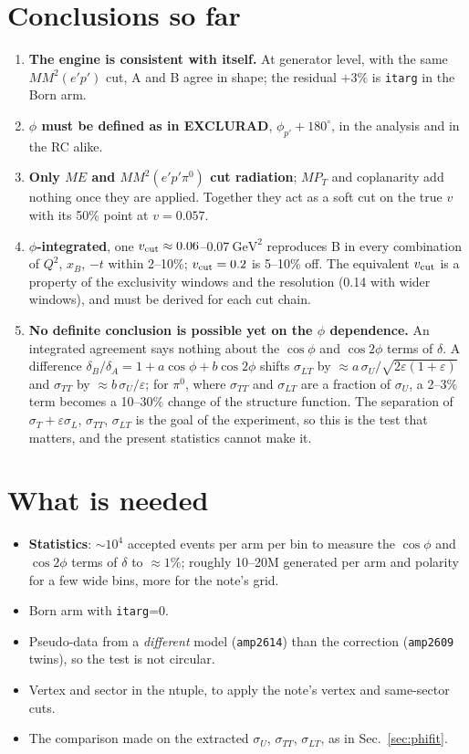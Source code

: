 \documentclass[11pt]{article}
\newcommand{\vcut}{v_{\rm cut}}
\newcommand{\mmep}{MM^2(e'p')}
\newcommand{\mmtot}{MM^2(e'p'\pi^0)}
\begin{document}
\section{Conclusions so far}

\begin{enumerate}
\item \textbf{The engine is consistent with itself.} At generator level, with the same $\mmep$ cut,
  A and B agree in shape; the residual $+3\%$ is \texttt{itarg} in the Born arm.
\item \textbf{$\phi$ must be defined as in EXCLURAD}, $\phi_{p'}+180^\circ$, in the analysis and in
  the RC alike.
\item \textbf{Only $ME$ and $\mmtot$ cut radiation}; $MP_T$ and coplanarity add nothing once they are
  applied. Together they act as a soft cut on the true $v$ with its 50\% point at $v=0.057$.
\item \textbf{$\phi$-integrated}, one $\vcut\approx0.06$--$0.07~\mathrm{GeV^2}$ reproduces B in every
  combination of $Q^2$, $x_B$, $-t$ within 2--10\%; $\vcut=0.2$ is 5--10\% off. The equivalent $\vcut$
  is a property of the exclusivity windows and the resolution (0.14 with wider windows), and must be
  derived for each cut chain.
\item \textbf{No definite conclusion is possible yet on the $\phi$ dependence.} An integrated agreement
  says nothing about the $\cos\phi$ and $\cos2\phi$ terms of $\delta$. A difference
  $\delta_B/\delta_A=1+a\cos\phi+b\cos2\phi$ shifts $\sigma_{LT}$ by $\approx a\,\sigma_U/\sqrt{2\varepsilon(1+\varepsilon)}$
  and $\sigma_{TT}$ by $\approx b\,\sigma_U/\varepsilon$; for $\pi^0$, where $\sigma_{TT}$ and
  $\sigma_{LT}$ are a fraction of $\sigma_U$, a 2--3\% term becomes a 10--30\% change of the
  structure function. The separation of $\sigma_T+\varepsilon\sigma_L$, $\sigma_{TT}$, $\sigma_{LT}$
  is the goal of the experiment, so this is the test that matters, and the present statistics cannot
  make it.
\end{enumerate}

\section{What is needed}
\begin{itemize}
\item \textbf{Statistics}: $\sim10^4$ accepted events per arm per bin to measure the $\cos\phi$ and
  $\cos2\phi$ terms of $\delta$ to $\approx1\%$; roughly 10--20M generated per arm and polarity for a
  few wide bins, more for the note's grid.
\item Born arm with \texttt{itarg}=0.
\item Pseudo-data from a \emph{different} model (\texttt{amp2614}) than the correction
  (\texttt{amp2609} twins), so the test is not circular.
\item Vertex and sector in the ntuple, to apply the note's vertex and same-sector cuts.
\item The comparison made on the extracted $\sigma_U$, $\sigma_{TT}$, $\sigma_{LT}$, as in
  Sec.~\ref{sec:phifit}.
\end{itemize}
\end{document}
